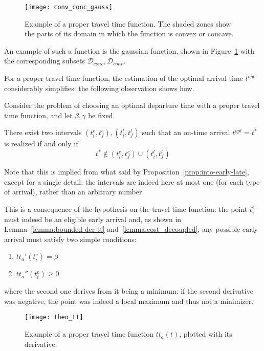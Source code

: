 \begin{figure}
  \centering
  \texttt{[image: conv\_conc\_gauss]}
  \caption{
    Example of a proper travel time function.
  The shaded zones show the parts of its domain in which the function is convex or concave.}
  \label{fig:conc-conv-gauss}
\end{figure}

An example of such a function is the gaussian function,
shown in Figure~\ref{fig:conc-conv-gauss} with the corresponding subsets \(\mathcal{D}_{conc}, \mathcal{D}_{conv}\).

For a proper travel time function,
the estimation of the optimal arrival time \(t^{opt}\) considerably simplifies:
the following observation shows how.
\begin{obs}
  \label{obs:simplified-char}
  Consider the problem of choosing an optimal departure time
  with a proper travel time function, and let \(\beta, \gamma\) be fixed.

  There exist two intervals \((t_i^e, t_f^e), (t_i^l, t_f^l)\) such that an on-time arrival \(t^{opt} = t^*\) is realized if and only if
  \begin{equation*}
    t^* \notin (t_i^e, t_f^e) \cup  (t_i^l, t_f^l)
  \end{equation*}
\end{obs}

Note that this is implied from what said by Proposition~\ref{prop:into-early-late},
except for a single detail:
the intervals are indeed here at most one (for each type of arrival), rather than an arbitrary number.

This is a consequence of the hypothesis on the travel time function:
the point \(t_i^e\) must indeed be an eligible early arrival and,
as shown in Lemma~\ref{lemma:bounded-der-tt} and~\ref{lemma:cost_decoupled},
any possible early arrival must satisfy two simple conditions:
\begin{enumerate}
\item \(tt_a'(t_i^e) = \beta\)
\item \(tt_a''(t_i^e) \geq 0\)
\end{enumerate}
where the second one derives from it being a minimum:
if the second derivative was negative, the point was indeed a local maximum and thus not a minimizer.

\begin{figure}
  \centering
  \texttt{[image: theo\_tt]}
  \caption{
    Example of a proper travel time function \(tt_a(t)\),
  plotted with its derivative.}
  \label{fig:theo_tt}
\end{figure}

